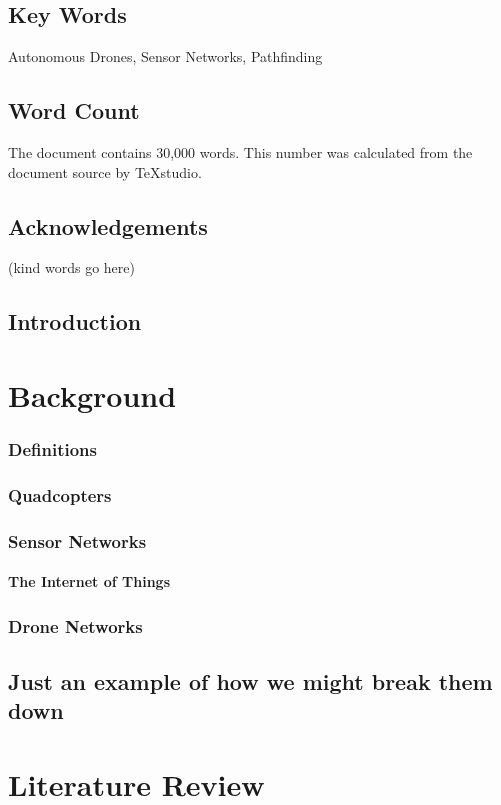 \documentclass[12pt,a4paper,twoside]{report}
\begin{document}
	\section{Key Words}
	Autonomous Drones, Sensor Networks, Pathfinding
	\section{Word Count}
	The document contains 30,000 words. This number was calculated from the document source by TeXstudio.

	\section{Acknowledgements}
	(kind words go here)
	
	\section{Introduction}

\chapter{Background}
	\subsection{Definitions}
	\subsection{Quadcopters}
	\subsection{Sensor Networks}
		\subsubsection{The Internet of Things}
	\subsection{Drone Networks}
	\section{Just an example of how we might break them down}
	
\chapter{Literature Review}
\end{document}

